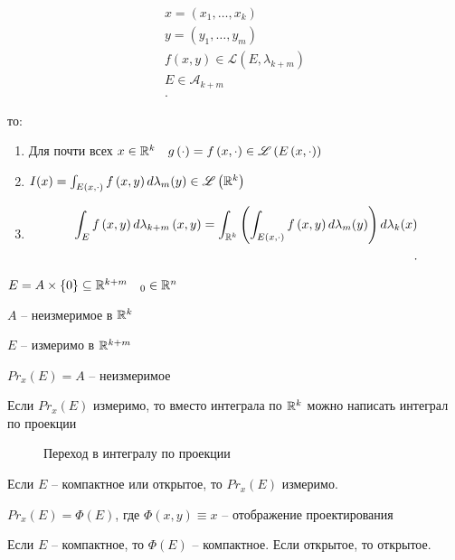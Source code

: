


\begin{theorem}
    [Фубини]

    \begin{align*}
        x = \left( x_1, \ldots, x_k \right) \\
        y = \left( y_1, \ldots, y_m \right) \\
        f(x, y) \in \mathscr L\left( E, \lambda_{k+m} \right) \\
        E\in \mathscr A_{k+m}\\
    .\end{align*}

    то:
    \begin{enumerate}
        \item Для почти всех $x\in \mathbb{R}^k \quad g\left( \cdot  \right)  = f\left( x, \cdot  \right) \in \mathscr L\left( E\left( x, \cdot  \right)  \right) $
        \item $I(x) = \int_{E\left( x, \cdot  \right) } f\left( x, y \right) d\lambda_m(y) \in \mathscr L\left( \mathbb{R}^k \right)   $\\
        \item 
            \begin{align*}
                \int_E f\left( x, y \right) d\lambda_{k+m}\left( x, y \right)  = \int_{\mathbb{R}^k} \left( \int_{E\left( x, \cdot  \right) } f\left( x, y \right) d\lambda_m(y) \right) d\lambda_k(x)\\
            .\end{align*}
    \end{enumerate}         
\end{theorem}

\begin{example}
    $E = A \times \{0\} \subseteq \mathbb{R}^{k + m} \quad_0\in \mathbb{R}^n$

    $A$ -- неизмеримое в  $\mathbb{R}^k$

    $E$ -- измеримо в  $\mathbb{R}^{k+m}$

    $Pr_x(E) = A$ -- неизмеримое

    Если  $Pr_x(E)$ измеримо, то вместо интеграла по $\mathbb{R}^k$ можно написать интеграл по проекции
\end{example}

\begin{figure}[!ht]
    \centering
    \caption{Переход в интегралу по проекции}
    \label{fig:proection}
\end{figure}

\begin{note}
    Если $E$ -- компактное или открытое, то  $Pr_x(E)$ измеримо.

    $Pr_x(E) = \Phi(E)$, где  $\Phi(x,y)\equiv x$ -- отображение проектирования

    Если  $E$ -- компактное, то  $\Phi(E)$ -- компактное. Если открытое, то открытое.
\end{note}

